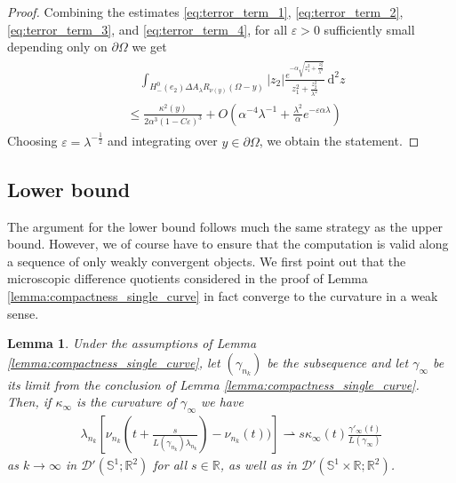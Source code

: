 \documentclass[11pt]{article}
\newcounter{statement}
\numberwithin{statement}{section}
\numberwithin{equation}{section}
\newtheorem{lemma}[statement]{Lemma}
\theoremstyle{remark}
\newcommand{\R}{\mathbb R} 				%
\newcommand{\intd}{\, \mathrm{d}} 				%
\newcommand{\warr}{\rightharpoonup}				%
\newcommand{\Sph}{{\mathbb S}}				%
\newcommand{\eps}{\varepsilon}
\begin{document}
\begin{proof}
	Combining the estimates \eqref{eq:terror_term_1},
        \eqref{eq:terror_term_2}, \eqref{eq:terror_term_3}, and
        \eqref{eq:terror_term_4}, for all $\eps>0$ sufficiently small
        depending only on $\partial \Omega$ we get
	\begin{align}
	  \begin{split}
            &\quad \int_{ H^0_-(e_2) \Delta A_\lambda R_{\nu(y)}
              (\Omega - y) } \left| z_2 \right| \frac{e^{-\alpha
                \sqrt{z_1^2 + \frac{z_2^2}{\lambda^2} }}}{z_1^2 +
              \frac{z_2^2}{\lambda^2}} \intd^2 z \\
            & \leq \frac{ \kappa^2(y)}{2\alpha^3(1-C\eps)^3} +
            O\left(\alpha^{-4}\lambda^{-1} + \frac{\lambda^2}{\alpha}
              e^{-\eps \alpha \lambda} \right)
	  \end{split}
	\end{align}
	Choosing $\eps = \lambda^{-\frac{1}{2}}$ and integrating over
        $y \in \partial \Omega$, we obtain the statement.
\end{proof}


\subsection{Lower bound}

The argument for the lower bound follows much the same strategy as the
upper bound.  However, we of course have to ensure that the
computation is valid along a sequence of only weakly convergent
objects.  We first point out that the microscopic difference quotients
considered in the proof of Lemma
\ref{lemma:compactness_single_curve} in fact converge to the curvature
in a weak sense.


\begin{lemma}\label{lemma:weak_curvature}
  Under the assumptions of Lemma
    \ref{lemma:compactness_single_curve}, let $(\gamma_{n_k})$ be the
    subsequence and let $\gamma_\infty$ be its limit from the
    conclusion of Lemma \ref{lemma:compactness_single_curve}. Then, if
    $\kappa_\infty$ is the curvature of $\gamma_\infty$ we have
        	\begin{align}\label{eq:conv_anis_scaling}
                  \lambda_{n_k} \left[
                  \nu_{n_k}\left(t+\frac{s}{L(\gamma_{n_k})
                  \lambda_{n_k}}\right) - 
                  \nu_{n_k}(t)) \right]\warr   s
                  \kappa_\infty(t)
                  \frac{\gamma'_\infty(t)}{L(\gamma_\infty)}
	\end{align}
        as $k \to \infty$ in $\mathcal D'(\Sph^1; \R^2)$ for all
        $s\in \R$, as well as in $\mathcal D'(\Sph^1\times \R; \R^2)$.
\end{lemma}
\end{document}
